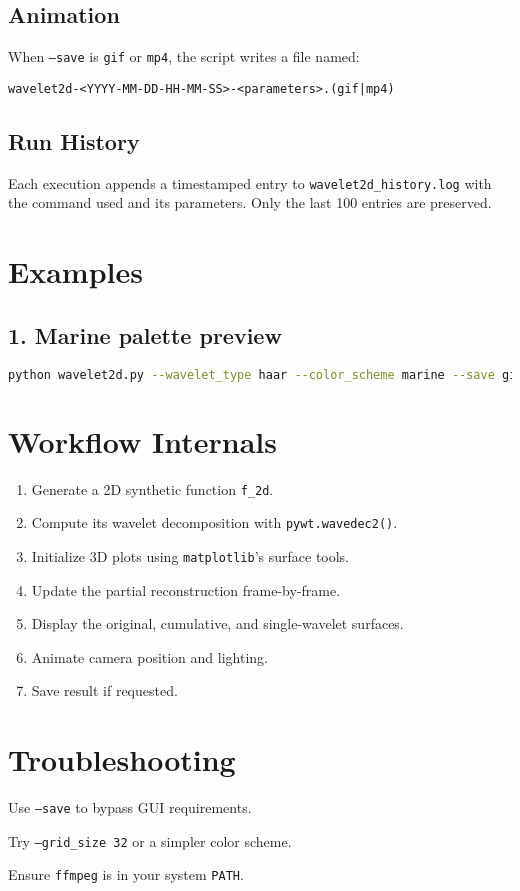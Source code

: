 \documentclass[12pt]{article}
\begin{document}
\subsection*{Animation}
When \texttt{--save} is \texttt{gif} or \texttt{mp4}, the script writes a file named:
\begin{center}
\texttt{wavelet2d-<YYYY-MM-DD-HH-MM-SS>-<parameters>.(gif|mp4)}
\end{center}

\subsection*{Run History}
Each execution appends a timestamped entry to \texttt{wavelet2d\_history.log} with the command used and its parameters. Only the last 100 entries are preserved.

\section{Examples}
\subsection*{1. Marine palette preview}
\begin{lstlisting}[language=bash]
python wavelet2d.py --wavelet_type haar --color_scheme marine --save gif
\end{lstlisting}

 

\section{Workflow Internals}
\begin{enumerate}[label=\arabic*.]
  \item Generate a 2D synthetic function \texttt{f\_2d}.
  \item Compute its wavelet decomposition with \texttt{pywt.wavedec2()}.
  \item Initialize 3D plots using \texttt{matplotlib}'s surface tools.
  \item Update the partial reconstruction frame-by-frame.
  \item Display the original, cumulative, and single-wavelet surfaces.
  \item Animate camera position and lighting.
  \item Save result if requested.
\end{enumerate}

\section{Troubleshooting}
\begin{description}[leftmargin=2.5cm, style=sameline]
  \item[No display] Use \texttt{--save} to bypass GUI requirements.
  \item[Low performance] Try \texttt{--grid\_size 32} or a simpler color scheme.
  \item[No MP4] Ensure \texttt{ffmpeg} is in your system \texttt{PATH}.
\end{description}
\end{document}
